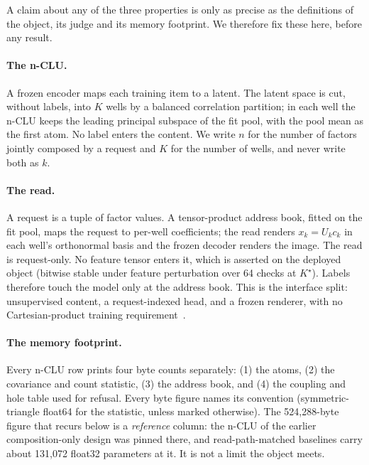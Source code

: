 \documentclass{article} %
\newcommand{\Kstar}{\ensuremath{K^{\star}}}
\begin{document}
A claim about any of the three properties is only as precise as the definitions of the object,
its judge and its memory footprint. We therefore fix these here, before any result.

\paragraph{The n-CLU.} A frozen encoder maps each training item to a latent. The latent
space is cut, without labels, into $K$ wells by a balanced correlation partition; in each well
the n-CLU keeps the leading principal subspace of the fit pool, with the pool mean as the
first atom. No label enters the content. We write $n$ for the number of factors jointly
composed by a request and $K$ for the number of wells, and never write both as $k$.

\paragraph{The read.} A request is a tuple of factor values. A tensor-product address book,
fitted on the fit pool, maps the request to per-well coefficients; the read renders
$x_k=U_k c_k$ in each well's orthonormal basis and the frozen decoder renders the image. The
read is request-only. No feature tensor enters it, which is asserted on the deployed object
(bitwise stable under feature perturbation over 64 checks at $\Kstar$).
Labels therefore touch the model only at the address book. This is the interface split:
unsupervised content, a request-indexed head, and a frozen renderer, with no Cartesian-product
training requirement~\citep{wiedemer_compositional_2023,lachapelle_additive_2023,montero_lost_2022}.

\paragraph{The memory footprint.} Every n-CLU row prints four byte counts
separately: (1) the atoms, (2) the covariance and count statistic, (3) the address book, and
(4) the coupling and hole table used for refusal. Every
byte figure names its convention (symmetric-triangle float64 for the statistic, unless marked
otherwise). The 524,288-byte figure that recurs below is a \emph{reference} column: the n-CLU
of the earlier composition-only design was pinned there, and read-path-matched baselines carry
about 131,072 float32 parameters at it. %
It is not a limit the object meets.
\end{document}
